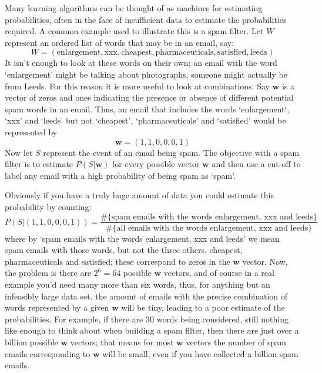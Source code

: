 \documentclass[11pt,a4paper]{scrartcl}
\begin{document}
Many learning algorithms can be thought of as machines for
estimating probabilities, often in the face of insufficient data to
estimate the probabilities required. A common example used to
illustrate this is a spam filter. Let $W$ represent an ordered list of
words that may be in an email, say:
\begin{equation}
W=(\mbox{enlargement},\mbox{xxx},\mbox{cheapest},\mbox{pharmaceuticals}, \mbox{satisfied},\mbox{leeds})
\end{equation}
It isn't enough to look at these words on their own; an email with the
word \lq{}enlargement\rq{} might be talking about photographs, someone
might actually be from Leeds. For this reason it is more useful to
look at combinations. Say $\textbf{w}$ is a vector of zeros and ones
indicating the presence or absence of different potential spam words
in an email. Thus, an email that includes the words
\lq{}enlargement\lq{}, \lq{}xxx\rq{} and \lq{}leeds\rq{} but not
\lq{}cheapest\rq{}, \lq{}pharmaceuticals\rq{} and \lq{}satisfied\rq{}
would be represented by
\begin{equation}
\textbf{w}=(1,1,0,0,0,1)
\end{equation}
Now let $S$ represent the event of an email being spam. The objective
with a spam filter is to estimate $P(S|\textbf{w})$ for every possible
vector $\textbf{w}$ and then use a cut-off to label any email with a
high probability of being spam as \lq{}spam\rq{}.

Obviously if you have a truly huge amount of data you could estimate this probability by counting:
\begin{equation}
P(S|(1,1,0,0,0,1))=\frac{\#\{\mbox{spam emails with the words enlargement, xxx and leeds}\}}{\#\{\mbox{all emails with the words enlargement, xxx and leeds}\}}
\end{equation}
where by \lq{}spam emails with the words enlargement, xxx and
leeds\rq{} we mean spam emails with those words, but not the three
others, cheapest, pharmaceuticals and satisfied; these correspond to
zeros in the $\textbf{w}$ vector. Now, the problem is there are
$2^6=64$ possible $\textbf{w}$ vectors, and of course in a real
example you'd need many more than six words, thus, for anything but an
infeasibly large data set, the amount of emails with the precise
combination of words represented by a given $\textbf{w}$ will be tiny,
leading to a poor estimate of the probabilities. For example, if there
are 30 words being considered, still nothing like enough to think
about when building a spam filter, then there are just over a billion
possible $\textbf{w}$ vectors; that means for most $\textbf{w}$
vectors the number of spam emails corresponding to $\textbf{w}$ will
be small, even if you have collected a billion spam emails.
\end{document}
